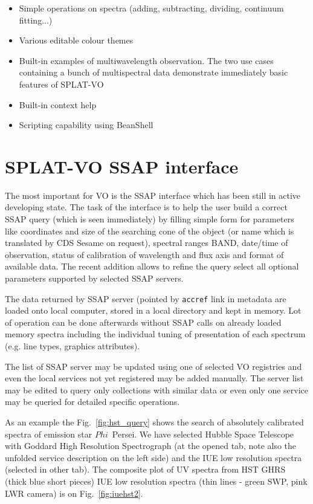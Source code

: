 \documentclass[final,authoryear,5p,times,twocolumn]{elsarticle}
\begin{document}
\begin{itemize}
\item Simple operations on spectra (adding, subtracting, dividing, continuum fitting...)

\item Various editable colour themes

\item Built-in examples of multiwavelength observation. The two use cases
containing a bunch of multispectral data demonstrate immediately basic features
of SPLAT-VO

\item Built-in context help

\item Scripting capability using BeanShell

\end{itemize}


\section{ SPLAT-VO SSAP interface}

The most important for VO is the SSAP interface which has been still in active
developing state.  The task of the interface is to help the user build a
correct SSAP query (which is seen immediately) by filling simple form for
parameters like coordinates and size of the searching cone of the object (or
name which is translated by CDS Sesame on request), spectral ranges BAND,
date/time of observation, status of calibration of  wavelength and flux axis
and format of available data.  The recent addition allows to refine the query
select all optional parameters supported by selected SSAP servers.

The data returned by SSAP server (pointed by {\tt accref} link in metadata are
loaded onto local computer, stored in a local directory  and kept in memory.
Lot of operation can be done afterwards without SSAP calls on already loaded
memory spectra including the individual tuning of presentation of each
spectrum (e.g. line types, graphics attributes).

The list of SSAP server may be updated using one of selected VO registries and even the local
services not yet registered may be added manually. The server list may be
edited to query only collections with similar data or even only one service
may be queried for detailed specific operations.

As an  example the  Fig.~\ref{fig:hst_query} shows the search of absolutely
calibrated spectra of  emission star $Phi$~Persei. We have selected Hubble
Space Telescope with Goddard High Resolution Spectrograph (at the opened tab, note
also the unfolded service description on the left side) and the IUE low resolution spectra (selected in other tab).
The  composite plot of UV spectra from HST GHRS (thick blue short pieces) IUE low resolution
spectra (thin lines - green SWP, pink LWR camera) is on Fig.~\ref{fig:iuehst2}.
\end{document}
